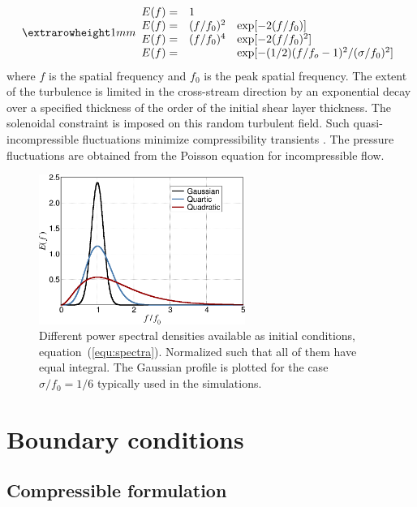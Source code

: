 \begin{equation}\setlength{\extrarowheight}{1mm}
\begin{array}{lll}
  E(f) = &1& \\
  E(f) = &(f/f_0)^2 &\exp[-2 (f/f_0)]\\
  E(f) = &(f/f_0)^4 &\exp[-2 (f/f_0)^2]\\
  E(f) = & & \exp[-(1/2)(f/f_o-1)^2/(\sigma/f_0)^2]
\end{array}
\label{equ:spectra}
\end{equation}
where $f$ is the spatial frequency and $f_0$ is the peak spatial frequency. The
extent of the turbulence is limited in the cross-stream direction by an
exponential decay over a specified thickness of the order of the initial shear
layer thickness. The solenoidal constraint is imposed on this random turbulent
field. Such quasi-incompressible fluctuations minimize compressibility
transients \cite{Erlebacher:1990}. The pressure fluctuations are obtained from
the Poisson equation for incompressible flow.

\begin{figure}
\includegraphics[clip,width=0.6\textwidth]{figs/Spectra.png}
\caption{Different power spectral densities available as initial conditions,
  equation~(\ref{equ:spectra}). Normalized such that all of them have equal
  integral. The Gaussian profile is plotted for the case $\sigma/f_0=1/6$
  typically used in the simulations.}\label{fig:eq-spc}
\end{figure}

\section{Boundary conditions}

\subsection{Compressible formulation}

